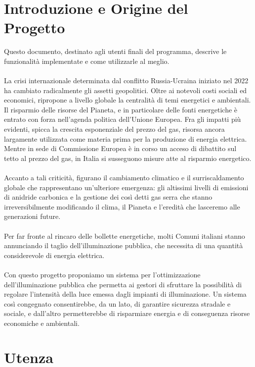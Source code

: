 \documentclass[a4paper, 12pt]{article}
\begin{document}
\makeindexdetails
\makefrontpage \makeversioni
\tableofcontents
\newpage
\clearpage
{}
\newpage
\section{Introduzione e Origine del Progetto}
Questo documento, destinato agli utenti finali del programma, descrive le funzionalità implementate e come utilizzarle al meglio.\\ \\
La crisi internazionale determinata dal conflitto Russia-Ucraina iniziato nel 2022 ha cambiato radicalmente gli assetti geopolitici. Oltre ai notevoli costi sociali ed economici, ripropone a livello globale la centralità di temi energetici e ambientali.\\
Il risparmio delle risorse del Pianeta, e in particolare delle fonti energetiche è entrato con forza nell'agenda politica dell'Unione Europea. Fra gli impatti più evidenti, spicca la crescita esponenziale del prezzo del gas, risorsa ancora largamente utilizzata come materia prima per la produzione di energia elettrica. Mentre in sede di Commissione Europea è in corso un acceso di dibattito sul tetto al prezzo del gas, in Italia si susseguono misure atte al risparmio energetico.\\\\
Accanto a tali criticità, figurano il cambiamento climatico e il surriscaldamento globale che rappresentano un'ulteriore emergenza: gli altissimi livelli di emissioni di anidride carbonica e la gestione dei così detti gas serra che stanno irreversibilmente modificando il clima, il Pianeta e l'eredità che lasceremo alle generazioni future.\\\\
Per far fronte al rincaro delle bollette energetiche, molti Comuni italiani stanno annunciando il taglio dell'illuminazione pubblica, che necessita di una quantità considerevole di energia elettrica.\\\\
Con questo progetto proponiamo un sistema per l'ottimizzazione dell'illuminazione pubblica che permetta ai gestori di sfruttare la possibilità di regolare l'intensità della luce emessa dagli impianti di illuminazione. Un sistema così congegnato consentirebbe, da un lato, di garantire sicurezza stradale e sociale, e dall'altro permetterebbe di risparmiare energia e di conseguenza risorse economiche e ambientali.

\newpage
\section{Utenza}
\end{document}
